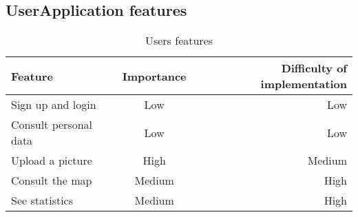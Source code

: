         \subsection{UserApplication features}
        \begin{table}[h!]
            \begin{center}
            
            \begin{tabular}{l|c|r} %
                \textbf{Feature} & \textbf{Importance} & \textbf{Difficulty of implementation}\\
                
                \hline
                Sign up and login & Low & Low\\
                Consult personal data & Low & Low\\
                Upload a picture & High & Medium\\
                Consult the map & Medium & High\\
                See statistics & Medium & High\\

            \end{tabular}
            \caption{Users features}
            \label{tab:table1}
            \end{center}
        \end{table}

